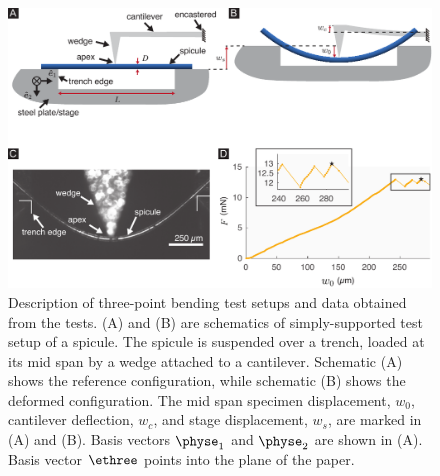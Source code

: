 
\begin{figure}[H]
\centering
\includegraphics[width=\textwidth]{Figures/SimplySupported_V3.pdf}

\caption{
Description of three-point bending test setups and data obtained from the tests. (\textsf{A}) and (\textsf{B}) are schematics of simply-supported test setup of a spicule. The spicule is suspended over a trench, loaded at its mid span by a wedge attached to a cantilever.
Schematic (\textsf{A}) shows the reference configuration,  while schematic (\textsf{B})  shows the deformed configuration. The mid span specimen displacement, $w_0$, cantilever deflection, $w_c$, and stage displacement, $w_s$, are marked in (\textsf{A}) and (\textsf{B}).
Basis vectors $\physe_1$ and $\physe_2$ are shown in (\textsf{A}). Basis vector $\ethree$ points into the plane of the paper.
}
\label{fig:SSconfig}
\end{figure}
%
